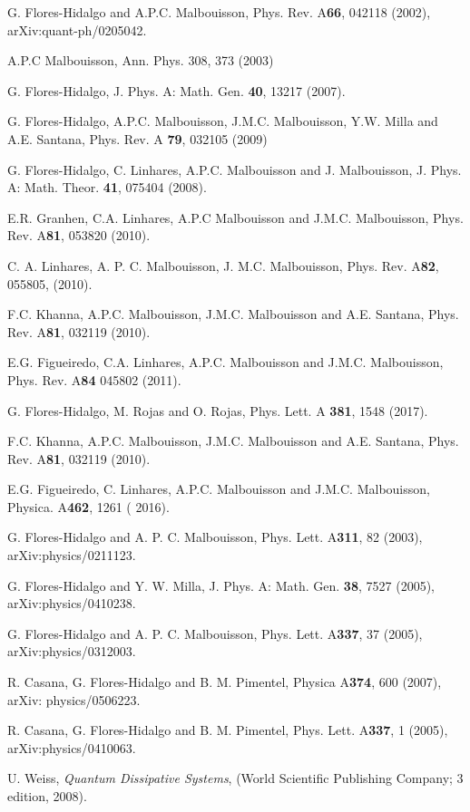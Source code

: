 \documentclass[10pt,english,twocolumn]{revtex4}
\begin{document}
\begin{thebibliography}{99}
 G. Flores-Hidalgo and A.P.C. Malbouisson, Phys.
Rev. A\textbf{66}, 042118 (2002), arXiv:quant-ph/0205042.

 A.P.C Malbouisson, Ann. Phys. 308, 373 (2003)

 G. Flores-Hidalgo, J. Phys. A: Math. Gen. \textbf{40},
13217 (2007).

 G. Flores-Hidalgo, A.P.C. Malbouisson,  J.M.C. Malbouisson, Y.W. Milla and A.E. Santana,
Phys. Rev. A {\bf 79},  032105  (2009)

 G. Flores-Hidalgo, C. Linhares, A.P.C. Malbouisson and J. Malbouisson,
 J. Phys. A: Math. Theor. {\bf 41},  075404 (2008). 

 E.R. Granhen,  C.A. Linhares, A.P.C Malbouisson and J.M.C.  Malbouisson, 
Phys. Rev. A{\bf 81}, 053820 (2010).

 C. A. Linhares, A. P. C. Malbouisson, J. M.C. Malbouisson, Phys. Rev. A{\bf 82}, 055805, (2010). 

 F.C. Khanna, A.P.C. Malbouisson, J.M.C. Malbouisson and A.E. Santana, Phys. Rev. A{\bf 81},  032119 (2010).

 E.G. Figueiredo, C.A.  Linhares, A.P.C. Malbouisson and J.M.C. Malbouisson, 
Phys. Rev. A{\bf 84}  045802 (2011). 

 G. Flores-Hidalgo, M.  Rojas and O. Rojas, Phys. Lett. A {\bf 381}, 1548 (2017).

 F.C. Khanna, A.P.C. Malbouisson, J.M.C. Malbouisson and A.E. Santana, Phys. Rev. A{\bf 81},  032119 (2010).

 E.G. Figueiredo, C. Linhares, A.P.C. Malbouisson and J.M.C. Malbouisson, 
 Physica. A{\bf 462}, 1261 ( 2016).

 G. Flores-Hidalgo and A. P. C. Malbouisson, Phys.
Lett. A\textbf{311}, 82 (2003), arXiv:physics/0211123.

 G. Flores-Hidalgo and Y. W. Milla, J. Phys. A: Math.
Gen. \textbf{38}, 7527 (2005), arXiv:physics/0410238.

 G. Flores-Hidalgo and A. P. C. Malbouisson, Phys.
Lett. A\textbf{337}, 37 (2005), arXiv:physics/0312003.

R. Casana, G. Flores-Hidalgo and B. M. Pimentel,
Physica A\textbf{374}, 600 (2007), arXiv: physics/0506223.

 R. Casana, G. Flores-Hidalgo and B. M. Pimentel,
Phys. Lett. A\textbf{337}, 1 (2005), arXiv:physics/0410063.

 U. Weiss, \textit{Quantum Dissipative Systems}, (World
Scientific Publishing Company; 3 edition, 2008). 

\end{thebibliography}
\end{document}
